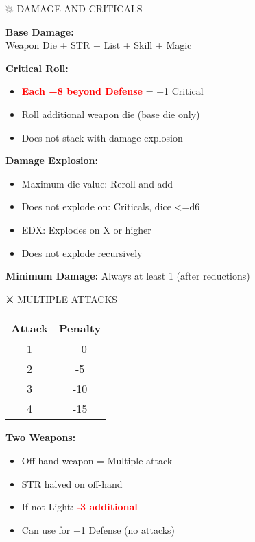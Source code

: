 \documentclass[10pt,a4paper,landscape]{article}
\newcommand{\critical}[1]{\textcolor{red}{\textbf{#1}}}
\begin{document}
\begin{multicols}{4}
		\begin{mainsection}{💥 DAMAGE AND CRITICALS}
			\begin{formula}
				\textbf{Base Damage:}\\
				Weapon Die + STR + List + Skill + Magic
			\end{formula}

			\textbf{Critical Roll:}
			\begin{itemize}[noitemsep,leftmargin=8pt]
				\item \critical{Each +8 beyond Defense} = +1 Critical
				\item Roll additional weapon die (base die only)
				\item Does not stack with damage explosion
			\end{itemize}

			\textbf{Damage Explosion:}
			\begin{itemize}[noitemsep,leftmargin=8pt]
				\item Maximum die value: Reroll and add
				\item Does not explode on: Criticals, dice <=d6
				\item EDX: Explodes on X or higher
				\item Does not explode recursively
			\end{itemize}

			\textbf{Minimum Damage:} Always at least 1 (after reductions)
		\end{mainsection}

		\begin{mainsection}{⚔️ MULTIPLE ATTACKS}
			\begin{tabular}{@{}cc@{}}
				\toprule
				\textbf{Attack} & \textbf{Penalty} \\
				\midrule
				1 & +0 \\
				2 & -5 \\
				3 & -10 \\
				4 & -15 \\
				\bottomrule
			\end{tabular}

			\textbf{Two Weapons:}
			\begin{itemize}[noitemsep,leftmargin=8pt]
				\item Off-hand weapon = Multiple attack
				\item STR halved on off-hand
				\item If not Light: \critical{-3 additional}
				\item Can use for +1 Defense (no attacks)
			\end{itemize}


\end{mainsection}
\end{multicols}
\end{document}
